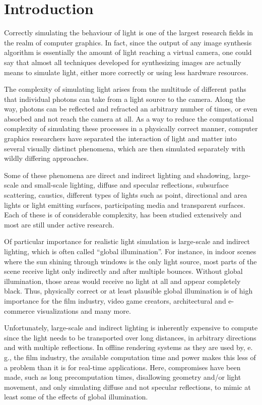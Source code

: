 
\chapter{Introduction}
\label{chap:introduction}

Correctly simulating the behaviour of light is one of the largest research fields in the realm of computer graphics. In fact, since the output of any image synthesis algorithm is essentially the amount of light reaching a virtual camera, one could say that almost all techniques developed for synthesizing images are actually means to simulate light, either more correctly or using less hardware resources.

The complexity of simulating light arises from the multitude of different paths that individual photons can take from a light source to the camera. Along the way, photons can be reflected and refracted an arbitrary number of times, or even absorbed and not reach the camera at all. As a way to reduce the computational complexity of simulating these processes in a physically correct manner, computer graphics researchers have separated the interaction of light and matter into several visually distinct phenomena, which are then simulated separately with wildly differing approaches.

Some of these phenomena are direct and indirect lighting and shadowing, large-scale and small-scale lighting, diffuse and specular reflections, subsurface scattering, caustics, different types of lights such as point, directional and area lights or light emitting surfaces, participating media and transparent surfaces. Each of these is of considerable complexity, has been studied extensively and most are still under active research.

Of particular importance for realistic light simulation is large-scale and indirect lighting, which is often called ``global illumination''. For instance, in indoor scenes where the sun shining through windows is the only light source, most parts of the scene receive light only indirectly and after multiple bounces. Without global illumination, those areas would receive no light at all and appear completely black. Thus, physically correct or at least plausible global illumination is of high importance for the film industry, video game creators, architectural and e-commerce visualizations and many more.

Unfortunately, large-scale and indirect lighting is inherently expensive to compute since the light needs to be transported over long distances, in arbitrary directions and with multiple reflections. In offline rendering systems as they are used by, e.\,g., the film industry, the available computation time and power makes this less of a problem than it is for real-time applications. Here, compromises have been made, such as long precomputation times, disallowing geometry and/or light movement, and only simulating diffuse and not specular reflections, to mimic at least some of the effects of global illumination.

